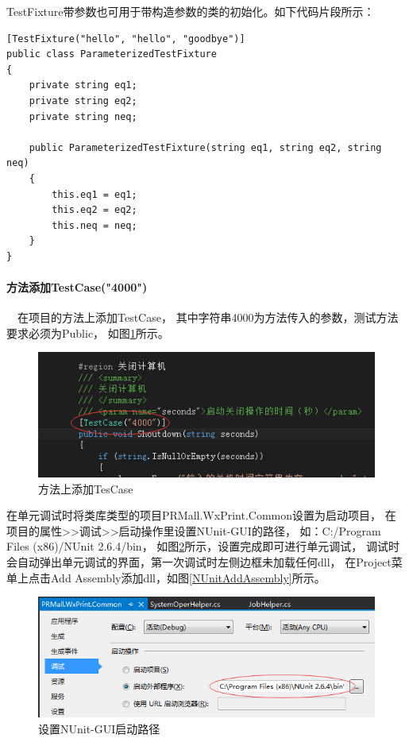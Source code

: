 \documentclass{book}
\begin{document}
TestFixture带参数也可用于带构造参数的类的初始化。如下代码片段所示：

\begin{lstlisting}[language={[Sharp]C}]
[TestFixture("hello", "hello", "goodbye")]
public class ParameterizedTestFixture
{
    private string eq1;
    private string eq2;
    private string neq;
    
    public ParameterizedTestFixture(string eq1, string eq2, string neq)
    {
        this.eq1 = eq1;
        this.eq2 = eq2;
        this.neq = neq;
    }
}
\end{lstlisting}

\paragraph{方法添加TestCase("4000")}~~在项目的方法上添加TestCase，
其中字符串4000为方法传入的参数，测试方法要求必须为Public，
如图\ref{AddTesCaseToFunction}所示。

\begin{figure}[htbp]
	\centering
	\includegraphics[scale=1]{AddTesCaseToFunction.jpg}
	\caption{方法上添加TesCase}
	\label{AddTesCaseToFunction}
\end{figure}

在单元调试时将类库类型的项目PRMall.WxPrint.Common设置为启动项目，
在项目的属性>>调试>>启动操作里设置NUnit-GUI的路径，
如：C:/Program Files (x86)/NUnit 2.6.4/bin，
如图\ref{SetNUnitStartUpPath}所示，设置完成即可进行单元调试，
调试时会自动弹出单元调试的界面，第一次调试时左侧边框未加载任何dll，
在Project菜单上点击Add Assembly添加dll，如图\ref{NUnitAddAssembly}所示。

\begin{figure}[htbp]
	\centering
	\includegraphics[scale=0.6]{SetNUnitStartUpPath.jpg}
	\caption{设置NUnit-GUI启动路径}
	\label{SetNUnitStartUpPath}
\end{figure}
\end{document}
